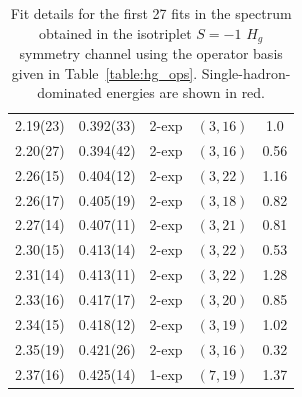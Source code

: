 \begin{table}[H]
\begin{tabu}{c|c|c|c|c}
        2.19(23)&0.392(33)&2{-}exp&$(3, 16)$&1.0 \\
        2.20(27)&0.394(42)&2{-}exp&$(3, 16)$&0.56 \\
        2.26(15)&0.404(12)&2{-}exp&$(3, 22)$&1.16 \\
        2.26(17)&0.405(19)&2{-}exp&$(3, 18)$&0.82 \\
        2.27(14)&0.407(11)&2{-}exp&$(3, 21)$&0.81 \\
        2.30(15)&0.413(14)&2{-}exp&$(3, 22)$&0.53 \\
        2.31(14)&0.413(11)&2{-}exp&$(3, 22)$&1.28 \\
        2.33(16)&0.417(17)&2{-}exp&$(3, 20)$&0.85 \\
        \rowfont{\color{red}}
        2.34(15)&0.418(12)&2{-}exp&$(3, 19)$&1.02 \\
        \rowfont{\color{red}}
        2.35(19)&0.421(26)&2{-}exp&$(3, 16)$&0.32 \\
        \rowfont{\color{red}}
        2.37(16)&0.425(14)&1{-}exp&$(7, 19)$&1.37
    \end{tabu}
    \caption[Fit details for the first 27 fits in the spectrum obtained in the isotriplet $S=-1$ $H_g$ symmetry channel using the operator basis given in Table~\ref{table:hg_ops}.]{Fit details for the first 27 fits in the spectrum obtained in the isotriplet $S=-1$ $H_g$ symmetry channel using the operator basis given in Table~\ref{table:hg_ops}. Single-hadron-dominated energies are shown in red.}\label{table:hg_fits1}
\end{table}

